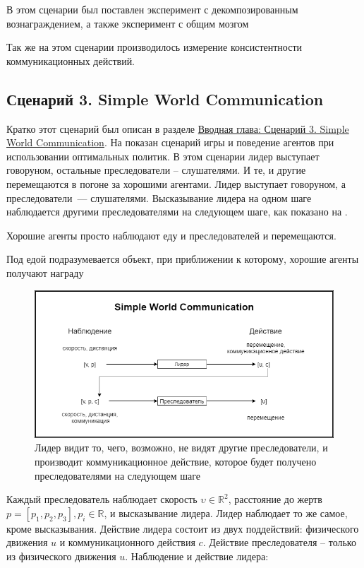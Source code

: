 В этом сценарии был поставлен эксперимент с декомпозированным вознаграждением, а также эксперимент с общим мозгом

Так же на этом сценарии производилось измерение консистентности коммуникационных действий.

\subsection{Сценарий 3. Simple World Communication} \label{exp-swc}

Кратко этот сценарий был описан в разделе \hyperref[intro-swc]{Вводная глава: Сценарий 3. Simple World Communication}. На  показан сценарий игры и поведение агентов при использовании оптимальных политик. В этом сценарии лидер выступает говоруном, остальные преследователи – слушателями. И те, и другие перемещаются в погоне за хорошими агентами. Лидер выступает говоруном, а преследователи~--- слушателями. Высказывание лидера на одном шаге наблюдается другими преследователями на следующем шаге, как показано на .

Хорошие агенты просто наблюдают еду и преследователей и перемещаются.

Под едой подразумевается объект, при приближении к которому, хорошие агенты получают награду

\begin{figure}[ht!]
    \center
    \includegraphics [scale=0.60] {my_folder/images/ch4/simple_world_communication.png}
    \caption{Лидер видит то, чего, возможно, не видят другие преследователи, и производит коммуникационное действие, которое будет получено преследователями на следующем шаге}
    \label{fig:exp-swc}
\end{figure}

Каждый преследователь наблюдает скорость $\upsilon \in \mathbb{R}^2$, расстояние до жертв $p = [p_1, p_2, p_3], p_i \in \mathbb{R}$, и высказывание лидера. Лидер наблюдает то же самое, кроме высказывания. Действие лидера состоит из двух поддействий: физического движения $u$ и коммуникационного действия $c$. Действие преследователя – только из физического движения $u$.
Наблюдение и действие лидера:

